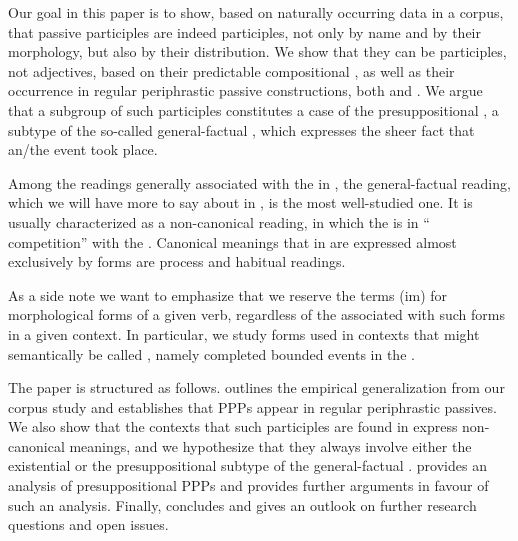 \documentclass[output=paper,modfonts,newtxmath,hidelinks]{langscibook}
\begin{document}
Our goal in this paper is to show, based on naturally occurring data in a corpus, that   passive participles are indeed participles, not only by name and by their morphology, but also by their distribution. We show that they can be participles, not adjectives, based on their predictable compositional , as well as their occurrence in regular periphrastic passive constructions, both  and . We argue that a subgroup of such participles constitutes a case of the presuppositional  \citep[in the sense of][]{gronndiss}, a subtype of the so-called general-factual , which expresses the sheer fact that an/the event took place. 

Among the readings generally associated with the  in , the general-factual reading, which we will have more to say about in , is the most well-studied one. It is usually characterized as a non-canonical reading, in which the  is in `` competition'' with the  \citep[a term that goes back to at least][]{mathesius38}. Canonical  meanings that in  are expressed almost exclusively by  forms are process and habitual readings. 

\largerpage[2]
As a side note we want to emphasize that we reserve the terms (im) for morphological forms of a given verb, regardless of the  associated with such forms in a given context. In particular, we study  forms used in contexts that might semantically be called , namely completed bounded events in the .

The paper is structured as follows.  outlines the empirical generalization from our corpus study and establishes that  PPPs appear in regular periphrastic passives. We also show that the  contexts that such participles are found in express non-canonical  meanings, and we hypothesize that they always involve either the existential or the presuppositional subtype of the general-factual .  provides an analysis of presuppositional  PPPs and provides further arguments in favour of such an analysis. Finally,  concludes and gives an outlook on further research questions and open issues. 
\end{document}
